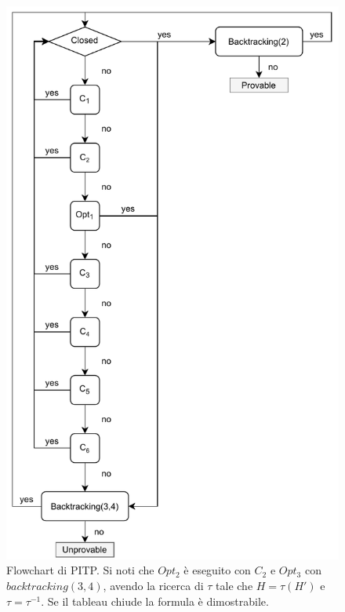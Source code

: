 \documentclass[a4paper,12pt, oneside]{book}
\begin{document}
\begin{figure}
  \centering
  \includegraphics[scale = 1]{img/pitp.pdf}
  \caption{Flowchart di PITP. Si noti che $Opt_2$ è eseguito con $C_2$ e $Opt_3$
    con $backtracking(3,4)$, avendo la ricerca di $\tau$ tale che $H=\tau(H')$ e
    $\tau = \tau^{-1}$. Se il tableau chiude la formula è dimostrabile.}
  \label{fig:pitp}
\end{figure}
\end{document}
